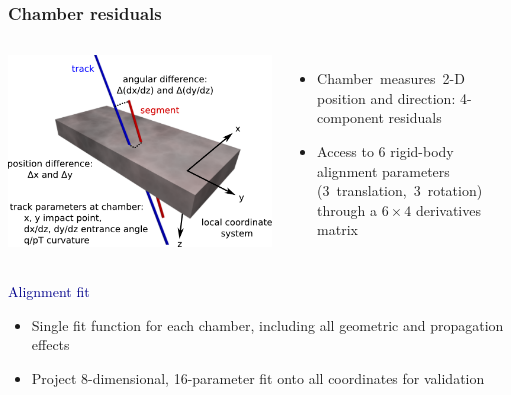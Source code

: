 \documentclass[compress]{beamer}
\begin{document}
\begin{frame}
\frametitle{Chamber residuals}

\begin{columns}
\includegraphics[width=\linewidth]{dt_coordinates.pdf}

\begin{itemize}
\item \mbox{Chamber measures 2-D\hspace{-1 cm}} \\ position and direction: 4-component residuals
\item Access to 6 rigid-body alignment parameters \mbox{(3~translation, 3~rotation)\hspace{-0.5 cm}} through a $6\times 4$ derivatives matrix
\end{itemize}
\end{columns}

\vspace{0.75 cm}
\hspace{-0.83 cm} \textcolor{darkblue}{\Large Alignment fit}

\vfill
\begin{itemize}
\item Single fit function for each chamber, including all geometric and propagation effects
\item Project 8-dimensional, 16-parameter fit onto all coordinates for validation
\end{itemize}
\end{frame}
\end{document}

